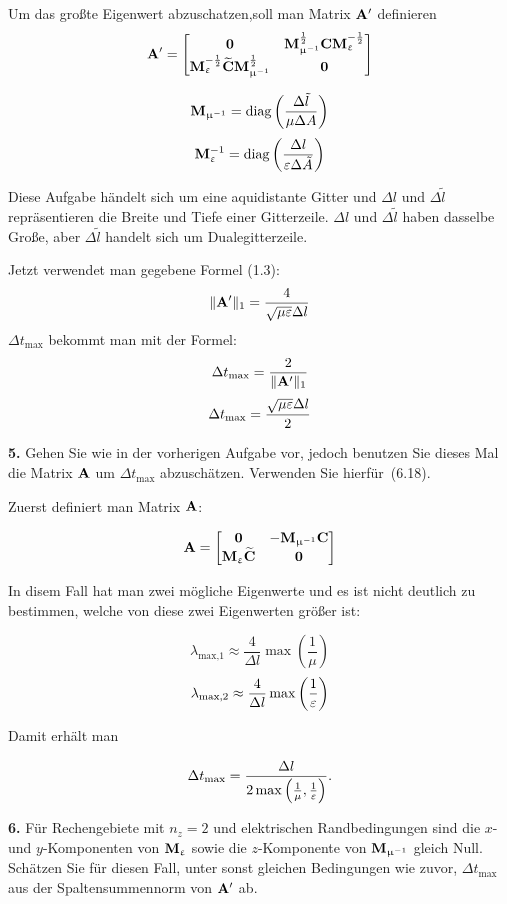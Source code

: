 \documentclass[Protokollheft.tex]{subfiles}
\begin{document}
Um das großte Eigenwert abzuschatzen,soll man Matrix $ \mathbf{A} '$ definieren
$$ \mathbf{A} '=\begin{bmatrix}
\boldsymbol{0} & \mathbf{M}_{\upmu^{-1}}^{\frac12}\mathbf{C}\mathbf{M}_{\upvarepsilon}^{-\frac12}\\
\mathbf{M}_{\upvarepsilon}^{-\frac12}\widetilde{\mathbf{C}} \mathbf{M}_{\upmu^{-1}}^{\frac12} & \boldsymbol{0}
\end{bmatrix} $$



$$\mathbf{M}_{\upmu^{-1}} = \text{diag}\left(\frac{\Delta\tilde{l}}{\mu\Delta A}\right) $$
$$\mathbf{M}_{\upvarepsilon}^{-1} = \text{diag}\left(\frac{\Delta l}{\varepsilon\Delta \tilde{A}}\right) $$

Diese Aufgabe händelt sich um eine aquidistante Gitter und $\Delta l$ und  $\Delta \tilde{l}$  repräsentieren die Breite und Tiefe einer Gitterzeile. $\Delta l$ und  $\Delta \tilde{l}$ haben dasselbe Große, aber $\Delta \tilde{l}$ handelt sich um Dualegitterzeile.

Jetzt verwendet man gegebene Formel (1.3):
$$\| \mathbf{A} '\|_1 = \frac{4}{\sqrt{\mu\varepsilon}\Delta l}$$
$\Delta t_{\text{max}}$ bekommt man mit der Formel:
$$ \Delta t_{\text{max}}=\frac{2}{\| \mathbf{A} '\|_1}$$
$$ \Delta t_{\text{max}}=\frac{\sqrt{\mu\varepsilon}\Delta l}{2}$$


\begin{framed}
	\noindent \textbf{5.} Gehen Sie wie in der vorherigen Aufgabe vor, jedoch benutzen Sie
    dieses Mal die Matrix $ \mathbf{A} $ um $\Delta t_{\text{max}}$ abzuschätzen. Verwenden Sie hierfür~(6.18).\label{exer:approxEVofA}
\end{framed}

Zuerst definiert man Matrix $ \mathbf{A} $:

$$ \mathbf{A} =\begin{bmatrix}
\boldsymbol{0} & -\mathbf{M}_{\upmu^{-1}}\mathbf{C}\\
\mathbf{M}_{\upvarepsilon}\widetilde{\mathbf{C}} & \boldsymbol{0}
\end{bmatrix} $$

In disem Fall hat man zwei mögliche Eigenwerte und es ist nicht  deutlich zu bestimmen, welche von diese zwei Eigenwerten größer ist:

$$\lambda_{\text{max,1}} \approx \frac{4}{\Delta l}\max\left(\frac{1}{\mu}\right) $$
$$\lambda_{\text{max,2}} \approx \frac{4}{\Delta l}\max\left(\frac{1}{\varepsilon}\right) $$

Damit erhält man 
 
$$\Delta t_{\text{max}}=\frac{\Delta l}{2\max\left(\frac{1}{\mu},\frac{1}{\varepsilon}\right)}.$$




\begin{framed}
	\noindent \textbf{6.} Für Rechengebiete mit $n_z=2$ und elektrischen
    Randbedingungen sind die $x$- und $y$-Komponenten von $\mathbf{M}_{\upvarepsilon}$ sowie die
    $z$-Komponente von $\mathbf{M}_{\upmu^{-1}}$ gleich Null. Schätzen Sie für diesen Fall,
    unter sonst gleichen Bedingungen wie zuvor, $\Delta t_{\text{max}}$ aus
    der Spaltensummennorm von $ \mathbf{A} '$ ab.\label{exer:approxDeltaTmax}
\end{framed}
\end{document}
